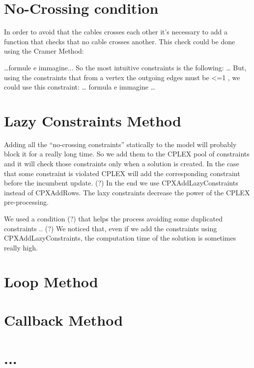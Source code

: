 \section{No-Crossing condition}
In order to avoid that the cables crosses each other it’s necessary to add a function that checks that no cable crosses another. This check could be done using the Cramer Method:

…formule e immagine...
So the most intuitive constraints is the following:  …
But, using the constraints that from a vertex the outgoing edges must be <=1 , we could use this constraint: 		… formula e immagine …

\section{Lazy Constraints Method}
Adding all the “no-crossing constraints” statically to the model will probably block it for a really long time. So we add them to the CPLEX pool of constraints and it will check those constraints only when a solution is created. In the case that some constraint is violated CPLEX will add the corresponding constraint before the incumbent update. (?)
In the end we use CPXAddLazyConstraints instead of CPXAddRows. 
The laxy constraints decrease the power of the CPLEX pre-processing.

We used a condition (?) that helps the process avoiding some duplicated constraints .. (?)
We noticed that, even if we add the constraints using CPXAddLazyConstraints, the computation time of the solution is sometimes really high.  

\section{Loop Method}

\section{Callback Method}

\section{...}
